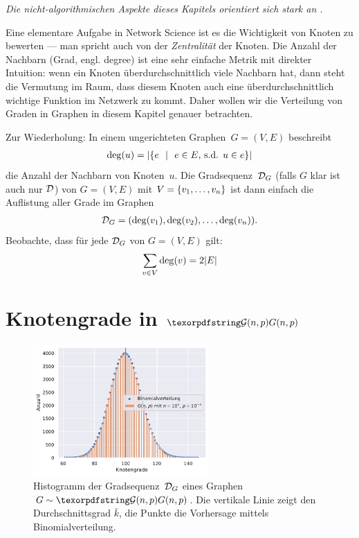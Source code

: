 \emph{Die nicht-algorithmischen Aspekte dieses Kapitels orientiert sich stark an \cite{barabasi2014network}.}
\bigskip

Eine elementare Aufgabe in Network Science ist es die Wichtigkeit von Knoten zu bewerten --- man spricht auch  von der \emph{Zentralität} der Knoten.
Die Anzahl der Nachbarn (Grad, engl. degree) ist eine sehr einfache Metrik mit direkter Intuition:
wenn ein Knoten überdurchschnittlich viele Nachbarn hat, dann steht die Vermutung im Raum, dass diesem Knoten auch eine überdurchschnittlich wichtige Funktion im Netzwerk zu kommt.
Daher wollen wir die Verteilung von Graden in Graphen in diesem Kapitel genauer betrachten.

Zur Wiederholung:
In einem ungerichteten Graphen~$G=(V,E)$ beschreibt
\begin{align}
    \deg(u) = \lvert \left\{ e \ \ \middle|\ \ e \in E\text{, s.d. } u \in e \right\}\rvert
\end{align}
die Anzahl der Nachbarn von Knoten~$u$.
Die  Gradsequenz~$\mathcal{D}_G$ (falls $G$ klar ist auch nur $\mathcal{D}$) von $G=(V,E)$ mit $V=\left\{v_1, \ldots, v_n\right\}$ ist dann einfach die Auflistung aller Grade im Graphen
\begin{align}
    \mathcal{D}_G = (\deg(v_1), \deg(v_2), \ldots, \deg(v_n)).
\end{align}
Beobachte, dass für jede $\mathcal{D}_G$ von $G=(V,E)$ gilt:
\begin{align}
    \sum_{v \in V} \deg(v) = 2 \lvert E\rvert
\end{align}


\section{Knotengrade in $\Gnp$}
\begin{figure}
    \begin{center}
        \includegraphics[width=0.6\textwidth]{data/gnp_degrees.pdf}
    \end{center}
    \caption{
        Histogramm der Gradsequenz~$\mathcal{D}_G$ eines Graphen~$G \sim \Gnp$.
        Die vertikale Linie zeigt den Durchschnittsgrad $\bar k$,
        die Punkte die Vorhersage mittels Binomialverteilung.
    }
    \label{fig:histogram_grade_gnp}
\end{figure}

